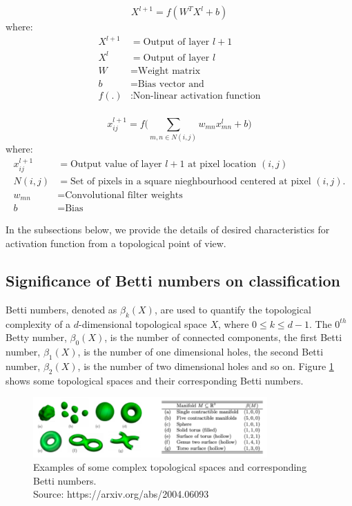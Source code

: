 \documentclass[wcp]{jmlr}
\begin{document}
\begin{equation} \label{eq:1}
  X^{l + 1} = f(W^TX^{l} + b)
\end{equation}
where:
\begin{align*}
X^{l + 1} &= \text{Output of layer $l + 1$ }\\
X^{l} &= \text{Output of layer $l$} \\
W &= \text{Weight matrix} \\
b &= \text{Bias vector and} \\
f(.) &: \text{Non-linear activation function}\\
\end{align*}

\begin{equation} \label{eq:2}
  x_{ij}^{l + 1} = f(\sum_{m,n \in N(i,j)}{w_{mn}x_{mn}^{l} + b)}
\end{equation}
where:
\begin{align*}
x_{ij}^{l + 1} &= \text{Output value of layer $l + 1$ at pixel location $(i,j)$ }\\
N(i,j) &= \text{Set of pixels in a square nieghbourhood centered at pixel $(i,j)$.} \\
w_{mn} &= \text{Convolutional filter weights } \\
b &= \text{Bias }
\end{align*}

In the subsections below, we provide the details of desired characteristics for activation function from a topological point of view.

\subsection{Significance of Betti numbers on classification}
Betti numbers, denoted as $\beta_k(X)$,   are used to quantify the topological complexity of a $d$-dimensional topological space  $X$, where  $0 \leq k \leq d-1$. The  $0^{th}$ Betty number, $\beta_0(X)$, is the number of connected components, the first Betti number, $\beta_1(X)$, is the number of one dimensional holes, the second Betti number, $\beta_2(X)$, is the number of two dimensional holes and so on. Figure \ref{fig:bett_numbers_illustration} shows some topological spaces and their corresponding Betti numbers.

\begin{figure}[htp]
\begin{center}
\includegraphics[width=0.8\textwidth]{images/bett_numbers_illustration.png}
\caption{Examples of some complex topological spaces and corresponding Betti numbers.\\ \footnotesize{Source: https://arxiv.org/abs/2004.06093}}
\label{fig:bett_numbers_illustration}
\end{center}
\end{figure}
\end{document}
